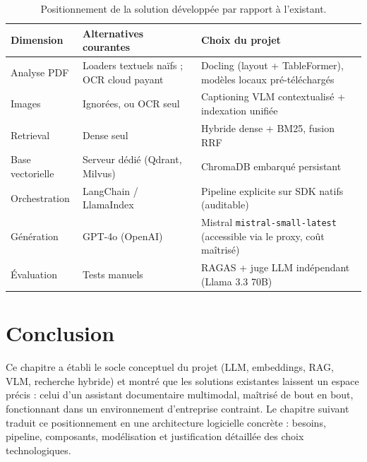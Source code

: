 \begin{table}[!htb]
\centering\small
\caption{Positionnement de la solution développée par rapport à l'existant.}
\label{tab:positionnement}
\begin{tabularx}{\textwidth}{@{}lXX@{}}
\toprule
\textbf{Dimension} & \textbf{Alternatives courantes} & \textbf{Choix du projet} \\
\midrule
Analyse PDF & Loaders textuels naïfs ; OCR cloud payant & Docling (layout + TableFormer), modèles locaux pré-téléchargés \\
Images & Ignorées, ou OCR seul & Captioning VLM contextualisé + indexation unifiée \\
Retrieval & Dense seul & Hybride dense + BM25, fusion RRF \\
Base vectorielle & Serveur dédié (Qdrant, Milvus) & ChromaDB embarqué persistant \\
Orchestration & LangChain / LlamaIndex & Pipeline explicite sur SDK natifs (auditable) \\
Génération & GPT-4o (OpenAI) & Mistral \texttt{mistral-small-latest} (accessible via le proxy, coût maîtrisé) \\
Évaluation & Tests manuels & RAGAS + juge LLM indépendant (Llama 3.3 70B) \\
\bottomrule
\end{tabularx}
\end{table}

\section{Conclusion}

Ce chapitre a établi le socle conceptuel du projet (LLM, embeddings, RAG, VLM, recherche
hybride) et montré que les solutions existantes laissent un espace précis : celui d'un
assistant documentaire multimodal, maîtrisé de bout en bout, fonctionnant dans un
environnement d'entreprise contraint. Le chapitre suivant traduit ce positionnement en une
architecture logicielle concrète : besoins, pipeline, composants, modélisation et
justification détaillée des choix technologiques.
